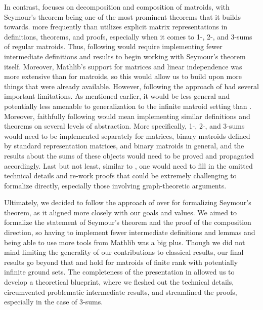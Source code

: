 In contrast, \citeauthor{Truemper2016} \cite{Truemper2016} focuses on decomposition and composition of matroids, with Seymour's theorem being one of the most prominent theorems that it builds towards. \citeauthor{Truemper2016} \cite{Truemper2016} more frequently than \citeauthor{Oxley2011} \cite{Oxley2011} utilizes explicit matrix representations in definitions, theorems, and proofs, especially when it comes to 1-, 2-, and 3-sums of regular matroids. Thus, following \cite{Truemper2016} would require implementing fewer intermediate definitions and results to begin working with Seymour's theorem itself. Moreover, Mathlib's support for matrices and linear independence was more extensive than for matroids, so this would allow us to build upon more things that were already available. However, following the approach of \cite{Truemper2016} had several important limitations. As mentioned earlier, it would be less general and potentially less amenable to generalization to the infinite matroid setting than \cite{Oxley2011}. Moreover, faithfully following \cite{Truemper2016} would mean implementing similar definitions and theorems on several levels of abstraction. More specifically, 1-, 2-, and 3-sums would need to be implemented separately for matrices, binary matroids defined by standard representation matrices, and binary matroids in general, and the results about the sums of these objects would need to be proved and propagated accordingly. Last but not least, similar to \cite{Oxley2011}, one would need to fill in the omitted technical details and re-work proofs that could be extremely challenging to formalize directly, especially those involving graph-theoretic arguments.

Ultimately, we decided to follow the approach of \cite{Truemper2016} over \cite{Oxley2011} for formalizing Seymour's theorem, as it aligned more closely with our goals and values. We aimed to formalize the statement of Seymour's theorem and the proof of the composition direction, so having to implement fewer intermediate definitions and lemmas and being able to use more tools from Mathlib was a big plus. Though we did not mind limiting the generality of our contributions to classical results, our final results go beyond that and hold for matroids of finite rank with potentially infinite ground sets. The completeness of the presentation in \cite{Truemper2016} allowed us to develop a theoretical blueprint, where we fleshed out the technical details, circumvented problematic intermediate results, and streamlined the proofs, especially in the case of 3-sums. %

